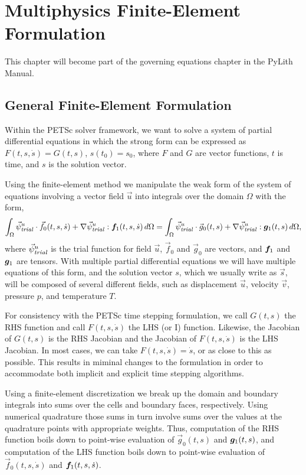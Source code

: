 \chapter{Multiphysics Finite-Element Formulation}
\label{cha:multiphysics:formulation}

This chapter will become part of the governing equations chapter in
the PyLith Manual.

\section{General Finite-Element Formulation}

Within the PETSc solver framework, we want to solve a system of
partial differential equations in which the strong form can be
expressed as $F(t,s,\dot{s}) = G(t,s)$, $s(t_0) = s_0$, where $F$ and
$G$ are vector functions, $t$ is time, and $s$ is the solution vector.

Using the finite-element method we manipulate the weak form of the
system of equations involving a vector field $\vec{u}$ into integrals
over the domain $\Omega$ with the form,
\begin{equation}
  \label{eqn:problem:form}
  \int_\Omega \trialvec[u] \cdot \vec{f}_0(t,s,\dot{s}) + \nabla \trialvec[u] : \tensor{f}
_1(t,s,\dot{s}) \, 
d\Omega =
  \int_\Omega \trialvec[u] \cdot \vec{g}_0(t,s) + \nabla \trialvec[u] : \tensor{g}_1(t,s) \, 
d\Omega,
\end{equation}
where $\trialvec[u]$ is the trial function for field $\vec{u}$,
$\vec{f}_0$ and $\vec{g}_0$ are vectors, and $\tensor{f}_1$ and
$\tensor{g}_1$ are tensors. With multiple partial differential
equations we will have multiple equations of this form, and the
solution vector $s$, which we usually write as $\vec{s}$, will be
composed of several different fields, such as displacement $\vec{u}$,
velocity $\vec{v}$, pressure $p$, and temperature $T$.

For consistency with the PETSc time stepping formulation, we call
$G(t,s)$ the RHS function and call $F(t,s,\dot{s})$ the LHS (or I)
function. Likewise, the Jacobian of $G(t,s)$ is the RHS Jacobian and
the Jacobian of $F(t,s,\dot{s})$ is the LHS Jacobian. In most cases,
we can take $F(t,s,\dot{s}) = \dot{s}$, or as close to this as
possible. This results in miminal changes to the formulation in order
to accommodate both implicit and explicit time stepping algorithms.

Using a finite-element discretization we break up the domain and
boundary integrals into sums over the cells and boundary faces,
respectively. Using numerical quadrature those sums in turn involve
sums over the values at the quadrature points with appropriate
weights. Thus, computation of the RHS function boils down to
point-wise evaluation of $\vec{g}_0(t,s)$ and $\tensor{g}_1(t,s)$, and
computation of the LHS function boils down to point-wise evaluation of
$\vec{f}_0(t,s,\dot{s})$ and $\tensor{f}_1(t,s,\dot{s})$.

